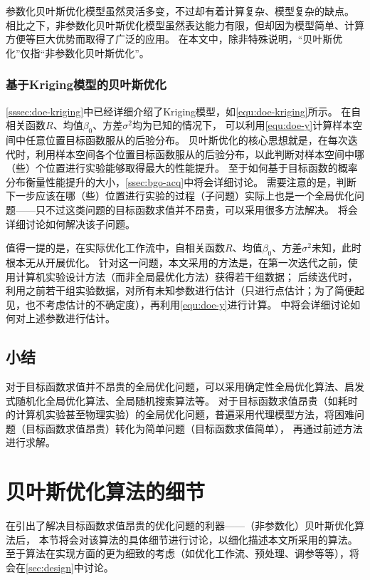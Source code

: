 \documentclass[index]{subfiles}
\begin{document}
参数化贝叶斯优化模型虽然灵活多变，不过却有着计算复杂、模型复杂的缺点。
相比之下，非参数化贝叶斯优化模型虽然表达能力有限，但却因为模型简单、计算方便等巨大优势而取得了广泛的应用。
在本文中，除非特殊说明，“贝叶斯优化”仅指“非参数化贝叶斯优化”。

\subsubsection{基于Kriging模型的贝叶斯优化}
\cref{sssec:doe-kriging}中已经详细介绍了Kriging模型，如\cref{equ:doe-kriging}所示。
在自相关函数$R$、均值$\beta_0$、方差$\sigma^2$均为已知的情况下，
可以利用\cref{equ:doe-y}计算样本空间中任意位置目标函数服从的后验分布。
贝叶斯优化的核心思想就是，在每次迭代时，利用样本空间各个位置目标函数服从的后验分布，以此判断对样本空间中哪（些）个位置进行实验能够取得最大的性能提升。
至于如何基于目标函数的概率分布衡量性能提升的大小，\cref{ssec:bgo-acq}中将会详细讨论。
需要注意的是，判断下一步应该在哪（些）位置进行实验的过程（子问题）实际上也是一个全局优化问题——只不过这类问题的目标函数求值并不昂贵，可以采用很多方法解决。
将会详细讨论如何解决该子问题。\cite{shahriari2016}

值得一提的是，在实际优化工作流中，自相关函数$R$、均值$\beta_0$、方差$\sigma^2$未知，此时根本无从开展优化。
针对这一问题，本文采用的方法是，在第一次迭代之前，使用计算机实验设计方法（而非全局最优化方法）获得若干组数据；
后续迭代时，利用之前若干组实验数据，对所有未知参数进行估计（只进行点估计；为了简便起见，也不考虑估计的不确定度），再利用\cref{equ:doe-y}进行计算。
中将会详细讨论如何对上述参数进行估计。

\subsection{小结}
对于目标函数求值并不昂贵的全局优化问题，可以采用确定性全局优化算法、启发式随机化全局优化算法、全局随机搜索算法等。
对于目标函数求值昂贵（如耗时的计算机实验甚至物理实验）的全局优化问题，普遍采用代理模型方法，将困难问题（目标函数求值昂贵）转化为简单问题（目标函数求值简单），
再通过前述方法进行求解。

\section{贝叶斯优化算法的细节}\label{sec:bgo}
在引出了解决目标函数求值昂贵的优化问题的利器——（非参数化）贝叶斯优化算法后，
本节将会对该算法的具体细节进行讨论，以细化描述本文所采用的算法。
至于算法在实现方面的更为细致的考虑（如优化工作流、预处理、调参等等），将会在\cref{sec:design}中讨论。
\end{document}
